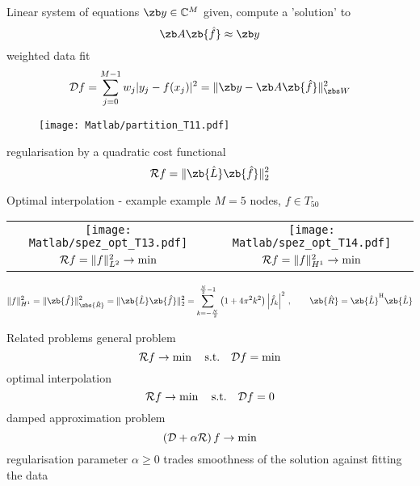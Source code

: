 \newpage
\hypertarget{iNFFT}{}
\vfill
{\color{blue} Linear system of equations}
\vfill
$\zb y \in \mathbb{C}^M$ given, compute a 'solution' to
\begin{equation*}
 \zb A \zb {\hat f} \approx \zb y %
\end{equation*}
\vfill
weighted data fit
\begin{equation*}
 {\cal D}f=\sum_{j=0}^{M-1} w_j |y_j - f(x_j)|^2 = \|\zb y - \zb A \zb {\hat f}\|_{\zbs W}^2
\end{equation*}
\begin{figure}[htbp]
 \begin{center}
    \texttt{[image: Matlab/partition\_T11.pdf]}
 \end{center}
\end{figure}
\vfill
regularisation by a quadratic cost functional
\begin{equation*}
  {\cal R}f = \|\zb {\hat L} \zb {\hat f}\|_2^2
\end{equation*}
\vfill

\newpage
\hypertarget{iNFFT}{}
\vfill
{\color{blue} Optimal interpolation - example}
\vfill
example $M=5$ nodes, $f \in T_{50}$
 \begin{center}
  \begin{tabular}{cc}
    \texttt{[image: Matlab/spez\_opt\_T13.pdf]} &
    \texttt{[image: Matlab/spez\_opt\_T14.pdf]} \\
    ${\cal R}f=\|f\|_{L^2}^2\rightarrow \min$ & ${\cal R}f=\|f\|_{H^1}^2\rightarrow \min$
  \end{tabular}
 \end{center}
\vfill
\begin{equation*}
  \|f\|_{H^1}^2
  =\|\zb {\hat f}\|_{\zbs {\hat R}}^2
  =\|\zb {\hat L} \zb {\hat f}\|_2^2
  = \sum_{k=-\frac{N}{2}}^{\frac{N}{2}-1} \left(1+4\pi^2 k^2 \right) \left|\hat f_k\right|^2
  \,,\qquad \zb {\hat R}=\zb {\hat L}^{\rm H} \zb {\hat L}
\end{equation*}
\vfill

\newpage
\hypertarget{iNFFT}{}
\vfill
{\color{blue} Related problems}
\vfill
general problem
\begin{equation*}
   {\cal R}f  \rightarrow \min \quad \text{s.t.} \quad
   {\cal D}f = \min
\end{equation*}
\vfill
optimal interpolation
\begin{equation*}
   {\cal R}f  \rightarrow \min \quad \text{s.t.} \quad
   {\cal D}f = 0
\end{equation*}
\vfill
damped approximation problem
 \begin{equation*}
   \left({\cal D}+\alpha{\cal R}\right)f \rightarrow \min
 \end{equation*}
\vfill
regularisation parameter $\alpha \ge 0$ trades smoothness of the solution against fitting the data
\vfill

